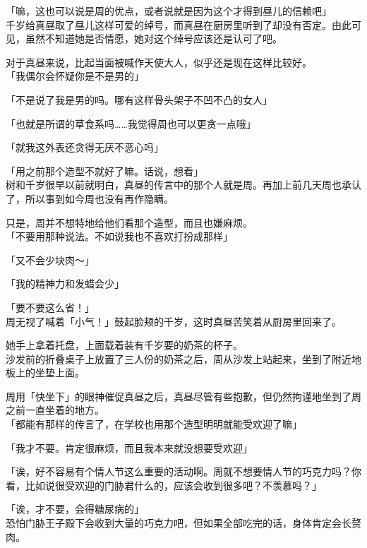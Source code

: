 「嘛，这也可以说是周的优点，或者说就是因为这个才得到昼儿的信赖吧」\\

千岁给真昼取了昼儿这样可爱的绰号，而真昼在厨房里听到了却没有否定。由此可见，虽然不知道她是否情愿，她对这个绰号应该还是认可了吧。

对于真昼来说，比起当面被喊作天使大人，似乎还是现在这样比较好。\\

「我偶尔会怀疑你是不是男的」

「不是说了我是男的吗。哪有这样骨头架子不凹不凸的女人」

「也就是所谓的草食系吗……我觉得周也可以更贪一点哦」

「就我这外表还贪得无厌不恶心吗」

「用之前那个造型不就好了嘛。话说，想看」\\

树和千岁很早以前就明白，真昼的传言中的那个人就是周。再加上前几天周也承认了，所以事到如今周也没有再作隐瞒。

只是，周并不想特地给他们看那个造型，而且也嫌麻烦。\\

「不要用那种说法。不如说我也不喜欢打扮成那样」

「又不会少块肉～」

「我的精神力和发蜡会少」

「要不要这么省！」\\

周无视了喊着「小气！」鼓起脸颊的千岁，这时真昼苦笑着从厨房里回来了。

她手上拿着托盘，上面载着装有千岁要的奶茶的杯子。\\

沙发前的折叠桌子上放置了三人份的奶茶之后，周从沙发上站起来，坐到了附近地板上的坐垫上面。

周用「快坐下」的眼神催促真昼之后，真昼尽管有些抱歉，但仍然拘谨地坐到了周之前一直坐着的地方。\\

「都能有那样的传言了，在学校也用那个造型明明就能受欢迎了嘛」

「我才不要。肯定很麻烦，而且我本来就没想要受欢迎」

「诶，好不容易有个情人节这么重要的活动啊。周就不想要情人节的巧克力吗？你看，比如说很受欢迎的门胁君什么的，应该会收到很多吧？不羡慕吗？」

「诶，才不要，会得糖尿病的」\\

恐怕门胁王子殿下会收到大量的巧克力吧，但如果全部吃完的话，身体肯定会长赘肉。\\

